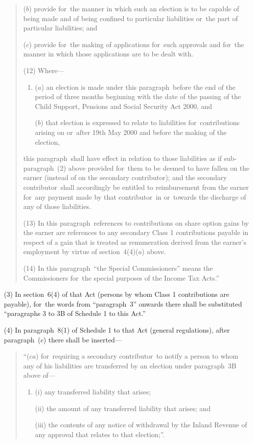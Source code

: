 \documentclass[12pt,a4paper]{article}
\begin{document}
\begin{quotation}
\begin{enumerate}
($b$) provide for~the manner in which such an election is to be capable of being made and of being confined to particular liabilities or~the part of particular liabilities; and

($c$) provide for~the making of applications for~such approvals and for~the manner in which those applications are to be dealt with.
\end{enumerate}

(12) Where—
\begin{enumerate}\item[]
($a$) an election is made under this paragraph~before the end of the period of three months beginning with the date of the passing of the Child Support, Pensions and Social Security Act 2000, and

($b$) that election is expressed to relate to liabilities for~contributions arising on or~after 19th May 2000 and before the making of the election,
\end{enumerate}
this paragraph~shall have effect in relation to those liabilities as if sub-paragraph~(2)  above provided for~them to be deemed to have fallen on the earner (instead of on the secondary contributor); and the secondary contributor~shall accordingly be entitled to reimbursement from the earner for~any payment made by that contributor~in or~towards the discharge of any of those liabilities.

(13) In this paragraph~references to contributions on share option gains by the earner are references to any secondary Class 1 contributions payable in respect of a gain that is treated as remuneration derived from the earner’s employment by virtue of section~4(4)($a$)  above.

(14) In this paragraph~“the Special Commissioners” means the Commissioners for~the special purposes of the Income Tax Acts.”
\end{quotation}

(3) In section~6(4)  of that Act (persons by whom Class 1 contributions are payable), for~the words from “paragraph~3” onwards there shall be substituted “paragraphs 3 to 3B of Schedule 1 to this Act.”

(4) In paragraph~8(1)  of Schedule 1 to that Act (general regulations), after paragraph~($c$)  there shall be inserted—
\begin{quotation}
“($ca$) for~requiring a secondary contributor~to notify a person to whom any of his liabilities are transferred by an election under paragraph~3B above of—
\begin{enumerate}\item[]
(i) any transferred liability that arises;

(ii) the amount of any transferred liability that arises; and

(iii) the contents of any notice of withdrawal by the Inland Revenue of any approval that relates to that election;”.
\end{enumerate}
\end{quotation}
\end{document}

